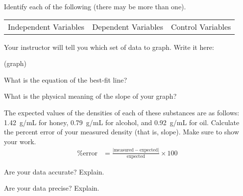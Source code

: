 \documentclass[10pt]{exam}
\begin{document}
\begin{questions}
  \question 
    Identify each of the following (there may be more than one).

    \begin{center}
      \begin{tabular}
        { m{} | m{}| m{} } 
        Independent Variables & 
        Dependent Variables   & 
        Control Variables  \\[8em]
      \end{tabular}
    \end{center}


  \question
    Your instructor will tell you which set of data to graph. Write it here: \fillin[][12em]

  \question
    (graph)


  \question
    What is the equation of the best-fit line?
    \vs

  \question
    What is the physical meaning of the slope of your graph?
    \vs

  \question
    The expected values of the densities of each of these substances are as follows: 1.42~g/mL for honey, 0.79~g/mL for alcohol, and 0.92~g/mL for oil.  Calculate the percent error of your measured density (that is, slope).  Make sure to show your work.
    \begin{align*}
      \text{\% error} &= 
      \frac{\left| 
        \text{measured} - \text{expected} 
      \right|}{
        \text{expected}
      } 
      \times 100
    \end{align*}
    \vs

  \question
    Are your data accurate? Explain.
    \vs

  \question
    Are your data precise? Explain.
    \vs

\end{questions}
\end{document}
